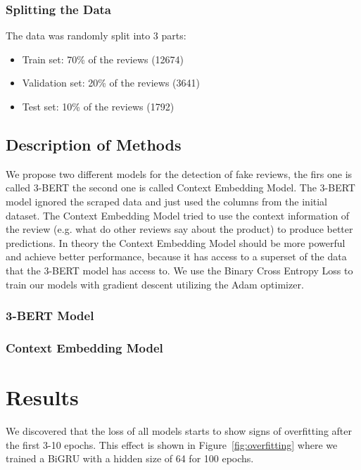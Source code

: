 \documentclass[utf8x]{ctexart}
\begin{document}
\subsubsection{Splitting the Data}

The data was randomly split into 3 parts:
\begin{itemize}
  \item Train set: 70\% of the reviews (12674)
  \item Validation set: 20\% of the reviews (3641)
  \item Test set: 10\% of the reviews (1792)
\end{itemize}

\subsection{Description of Methods}

We propose two different models for the detection of fake reviews, the firs one is called 3-BERT the second one is called Context Embedding Model. The 3-BERT model ignored the scraped data and just used the columns from the initial dataset. The Context Embedding Model tried to use the context information of the review (e.g. what do other reviews say about the product) to produce better predictions. In theory the Context Embedding Model should be more powerful and achieve better performance, because it has access to a superset of the data that the 3-BERT model has access to.
We use the Binary Cross Entropy Loss to train our models with gradient descent utilizing the Adam optimizer.

\subsubsection{3-BERT Model}




\subsubsection{Context Embedding Model}


\section{Results}

We discovered that the loss of all models  starts to show signs of overfitting after the first 3-10 epochs. This effect is shown in Figure~\ref{fig:overfitting} where we trained a BiGRU with a hidden size of 64 for 100 epochs.
\end{document}
